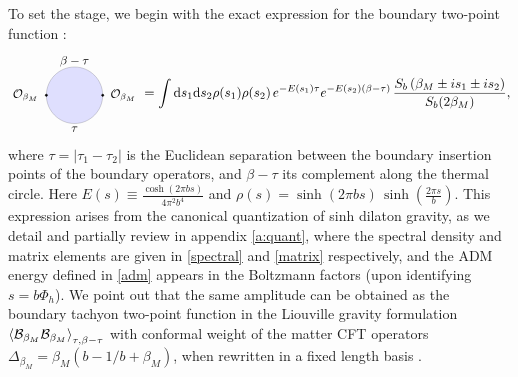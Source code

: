 \documentclass[a4paper,titlepage,12pt]{article}
\numberwithin{equation}{section}
\begin{document}
To set the stage, we begin with the exact expression for the boundary two-point function \cite{Mertens:2020hbs}:
\begin{align}\label{two-point}
    \begin{tikzpicture}[baseline={([yshift=-.5ex]current bounding box.center)}, scale=0.5]
\draw[fill=blue!40!white,opacity=0.3] (0,0) ellipse (1.5 and 1.5);
\draw[fill] (-1.5,0) circle (0.06);
\draw[fill] (1.5,0) circle (0.06); 
\node at (-2.6,0) {\small $\mathcal{O}_{\beta_M}$};
\node at (2.6,0) {\small $\mathcal{O}_{\beta_M}$};
\node at (0,-1.8) {\small $\tau$};
\node at (0,1.8) {\small $\beta-\tau$};
\end{tikzpicture}
    =
    \int  \mathrm{d} s_1 \mathrm{d} s_2 \rho(s_1) \rho(s_2)\hspace{0.05cm} e^{-E(s_1)\tau} e^{-E(s_2)(\beta-\tau)}\hspace{0.05cm}\frac{S_b\left(\beta_M \pm i s_1 \pm i s_2\right)}{S_b(2\beta_M)},
\end{align}
where $\tau=\left|\tau_1-\tau_2\right| $ is the Euclidean separation between the boundary insertion points of the boundary operators, and $\beta-\tau$ its complement along the thermal circle. Here $E(s) \equiv \frac{\cosh(2\pi b s)}{4\pi^2b^4}$ and $\rho(s) = \sinh(2\pi b s)\, \sinh\left(\frac{2\pi s}{b}\right)$. This expression arises from the canonical quantization of sinh dilaton gravity, as we detail and partially review in appendix \ref{a:quant}, where the spectral density and matrix elements are given in \eqref{spectral} and \eqref{matrix} respectively, and the ADM energy defined in \eqref{adm} appears in the Boltzmann factors (upon identifying $s=b\Phi_h$).
We point out that the same amplitude can be obtained as the boundary tachyon two-point function in the Liouville gravity formulation $ \braket{\mathcal{B}_{\beta_M}\mathcal{B}_{\beta_M}}_{\tau,\beta-\tau}$ with conformal weight of the matter CFT operators $\Delta_{\beta_M}=\beta_M(b-1/b+\beta_M)$, when rewritten in a fixed length basis \cite{Mertens:2020hbs}. 
\end{document}
